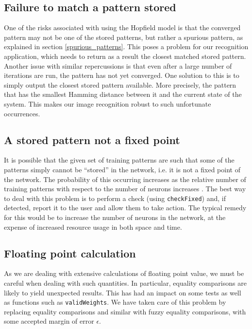 \subsection{Failure to match a pattern stored}
One of the risks associated with using the Hopfield model is that the converged pattern may not be one of the stored patterns, but rather a spurious pattern, as explained in section \ref{spurious_patterns}. This poses a problem for our recognition application, which needs to return as a result the closest matched stored pattern. Another issue with similar repercussions is that even after a large number of iterations are run, the pattern has not yet converged.
One solution to this  is to simply output the closest stored pattern available. More precisely, the pattern that has the smallest Hamming distance between it and the current state of the system. This makes our image recognition robust to such unfortunate occurrences.


\subsection{A stored pattern not a fixed point}
It is possible that the given set of training patterns are such that some of the patterns simply cannot be ``stored'' in the network, i.e. it is not a fixed point of the network. The probability of this occurring increases as the relative number of training patterns with respect to the number of neurons increases .
The best way to deal with this problem is to perform a check (using \texttt{checkFixed})  and, if detected, report it  to the user and allow them to take action. The typical remedy for this would be to increase the number of neurons in the network, at the expense of increased resource usage in both space and time.


\subsection{Floating point calculation}
As we are dealing with extensive calculations of floating point value, we must be careful when dealing with such quantities. In particular, equality comparisons are likely to yield unexpected results. This has had an impact on some tests as well as functions such as \texttt{validWeights}. We have taken care of this problem by replacing equality comparisons and similar with fuzzy equality comparisons, with some accepted margin of error $\epsilon$.
